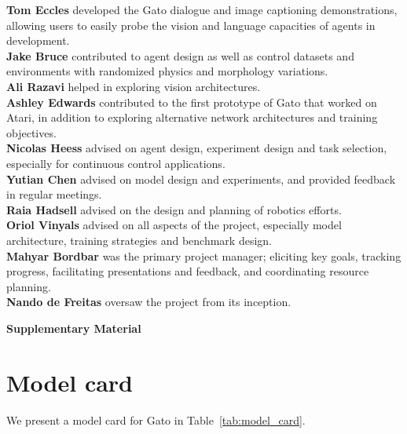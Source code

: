 \documentclass[10pt]{article} \usepackage[accepted]{tmlr}
\newcommand{\model}{{Gato}}
\begin{document}
\noindent \textbf{Tom Eccles} developed the \model{} dialogue and image captioning demonstrations, allowing users to easily probe the vision and language capacities of agents in development. \\
\noindent \textbf{Jake Bruce} contributed to agent design as well as control datasets and environments with randomized physics and morphology variations. \\
\noindent \textbf{Ali Razavi} helped in exploring vision architectures. \\
\noindent \textbf{Ashley Edwards} contributed to the first prototype of \model{} that worked on Atari, in addition to exploring alternative network architectures and training objectives. \\
\noindent \textbf{Nicolas Heess} advised on agent design, experiment design and task selection, especially for continuous control applications.  \\
\noindent \textbf{Yutian Chen} advised on model design and experiments, and provided feedback in regular meetings. \\
\noindent \textbf{Raia Hadsell} advised on the design and planning of robotics efforts.\\
\noindent \textbf{Oriol Vinyals} advised on all aspects of the project, especially model architecture, training strategies and benchmark design. \\
\noindent \textbf{Mahyar Bordbar} was the primary project manager; eliciting key goals, tracking progress, facilitating presentations and feedback, and coordinating resource planning. \\
\noindent \textbf{Nando de Freitas} oversaw the project from its inception.

\newpage



\clearpage
\appendix

{\LARGE \bf \noindent Supplementary Material}

\section{Model card}
\label{app:model_card}
We present a model card for \model{} in Table~\ref{tab:model_card}.
\end{document}
